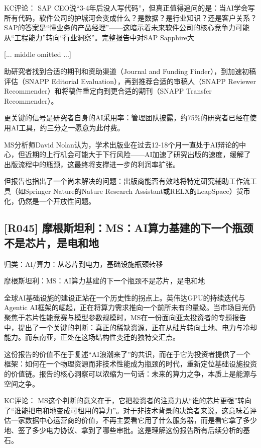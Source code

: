\documentclass[11pt]{ctexart}
\begin{document}
KC评论： SAP CEO说“3-4年后没人写代码”，但真正值得追问的是：当AI学会写所有代码，软件公司的护城河会变成什么？是数据？是行业知识？还是客户关系？SAP的答案是“懂业务的产品经理”——这暗示着未来软件公司的核心竞争力可能从“工程能力”转向“行业洞察”。完整报告中对SAP Sapphire大

[... middle omitted ...]

助研究者找到合适的期刊和资助渠道（Journal and Funding Finder），到加速初稿评估（SNAPP Editorial Evaluation），再到推荐合适的审稿人（SNAPP Reviewer Recommender）和将稿件重定向到更合适的期刊（SNAPP Transfer Recommender）。

更关键的信号是研究者自身的AI采用率：管理团队披露，约75\%的研究者已经在使用AI工具，约三分之一愿意为此付费。

MS分析师David Nolan认为，学术出版业在过去12-18个月一直处于AI辩论的中心，但近期的上行机会可能大于下行风险——AI加速了研究出版的速度，缓解了出版流程中的瓶颈，这最终将支撑进一步的利润率扩张。

但报告也指出了一个尚未解决的问题：出版商能否有效地将特定研究辅助工作流工具（如Springer Nature的Nature Research Assistant或RELX的LeapSpace）货币化，仍然是一个开放性问题。

\subsection{[R045] 摩根斯坦利：MS：AI算力基建的下一个瓶颈不是芯片，是电和地}
{\small\color{refgray}归类：AI/算力：从芯片到电力，基础设施瓶颈转移}

摩根斯坦利：MS：AI算力基建的下一个瓶颈不是芯片，是电和地

全球AI基础设施的建设正站在一个历史性的拐点上。英伟达GPU的持续迭代与Agentic AI框架的崛起，正在将算力需求推向一个前所未有的量级。当市场目光仍聚焦于芯片性能竞赛与模型参数规模时，MS在一份面向亚太投资者的专题报告中，提出了一个关键的判断：真正的稀缺资源，正在从硅片转向土地、电力与冷却能力。而东南亚，正处在这场结构性变迁的独特交汇点。

这份报告的价值不在于复述“AI浪潮来了”的共识，而在于它为投资者提供了一个框架：如何在一个物理资源而非技术性能成为瓶颈的时代，重新定位基础设施投资的价值链。报告的核心洞察可以浓缩为一句话：未来的算力之争，本质上是能源与空间之争。

KC评论： MS这个判断的意义在于，它把投资者的注意力从“谁的芯片更强”转向了“谁能把电和地变成可租用的算力”。对于非技术背景的决策者来说，这意味着评估一家数据中心运营商的价值，不再主要看它用了什么服务器，而是看它拿了多少地、签了多少电力协议、拿到了哪些审批。这是理解这份报告所有后续分析的基石。
\end{document}

